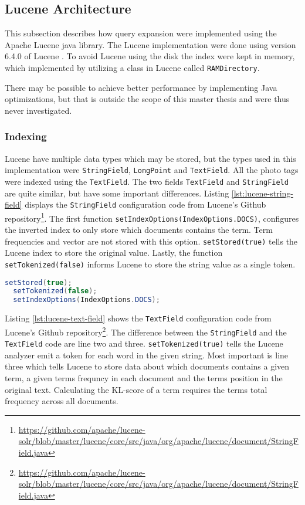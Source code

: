 \subsection{Lucene Architecture}
\label{sec:lucene}
This subsection describes how query expansion were implemented using the Apache Lucene java library.
The Lucene implementation were done using version 6.4.0 of Lucene \cite{lucene-documentation}.
To avoid Lucene using the disk the index were kept in memory,
which implemented by utilizing a class in Lucene called \texttt{RAMDirectory}.

There may be possible to achieve better performance by implementing Java optimizations,
but that is outside the scope of this master thesis and were thus never investigated.

\subsubsection{Indexing}
Lucene have multiple data types which may be stored,
but the types used in this implementation were \texttt{StringField}, \texttt{LongPoint} and \texttt{TextField}.
All the photo tags were indexed using the \texttt{TextField}.
The two fields \texttt{TextField} and \texttt{StringField} are quite similar,
but have some important differences.
Listing \ref{lst:lucene-string-field} displays the \texttt{StringField} configuration code from Lucene's Github repository\footnote{\url{https://github.com/apache/lucene-solr/blob/master/lucene/core/src/java/org/apache/lucene/document/StringField.java}}.
The first function \texttt{setIndexOptions(IndexOptions.DOCS)},
configures the inverted index to only store which documents contains the term.
Term frequencies and vector are not stored with this option.
\texttt{setStored(true)} tells the Lucene index to store the original value.
Lastly, the function \texttt{setTokenized(false)} informs Lucene to store the string value as a single token.

\begin{lstlisting}[language=java, caption={Lucene's \texttt{StringField} index configuration.}, label={lst:lucene-string-field}]
  setStored(true);
  setTokenized(false);
  setIndexOptions(IndexOptions.DOCS);
\end{lstlisting}

Listing \ref{lst:lucene-text-field} shows the \texttt{TextField} configuration code from Lucene's Github repository\footnote{\url{https://github.com/apache/lucene-solr/blob/master/lucene/core/src/java/org/apache/lucene/document/StringField.java}}.
The difference between the \texttt{StringField} and the \texttt{TextField} code are line two and three.
\texttt{setTokenized(true)} tells the Lucene analyzer emit a token for each word in the given string.
Most important is line three which tells Lucene to store data about which documents contains a given term,
a given terms frequncy in each document and the terms position in the original text.
Calculating the KL-score of a term requires the terms total frequency across all documents.

